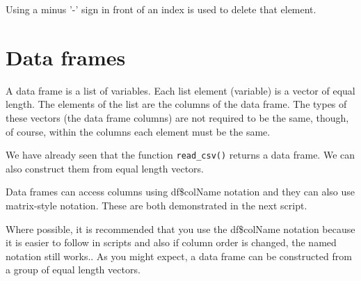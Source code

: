 \documentclass[titlepage]{book}\usepackage{knitr}
\begin{document}
Using a minus '-' sign in front of an index is used to delete that element.

\begin{knitrout}
\color{fgcolor}\begin{kframe}
\begin{alltt}
 \hlkwb{<-} \hlstd{(}\hlstd{,} \hlstd{,} \hlstd{,} \hlstd{,} \hlstd{,} \hlstd{,} \hlstd{,} \hlstd{,} \hlstd{,} \hlstd{,} \hlstd{,} \hlstd{,} \hlstd{,} \hlstd{,} \hlstd{)}
\hlstd{cc[}\hlstd{(}\hlstd{,}\hlstd{,}\hlstd{)]}
 \hlkwb{<-} \hlstd{(}\hlstd{,} \hlstd{,} \hlstd{,} \hlstd{,} \hlstd{,} \hlstd{,} \hlstd{)}
 \hlkwb{<-} \hlstd{ee[}\hlopt{-}\hlstd{]}
\end{alltt}
\end{kframe}
\end{knitrout}

\section{Data frames}
A data frame is a list of variables.  Each list element (variable) is a vector of equal length. The elements of the list are the columns of the data frame.  The types of these vectors (the data frame columns) are not required to be the same, though, of course, within the columns each element must be the same. 

We have already seen that the function \texttt{read\_csv()} returns a data frame. We can also construct them from equal length vectors. 

Data frames can access columns using df\$colName notation  and they can also use matrix-style notation. These are both demonstrated in the next script.

Where possible, it is recommended that you use the df\$colName notation because it is easier to follow in scripts and also if column order is changed, the named notation still works..
As you might expect, a data frame can be constructed from a group of equal length vectors.
\end{document}
